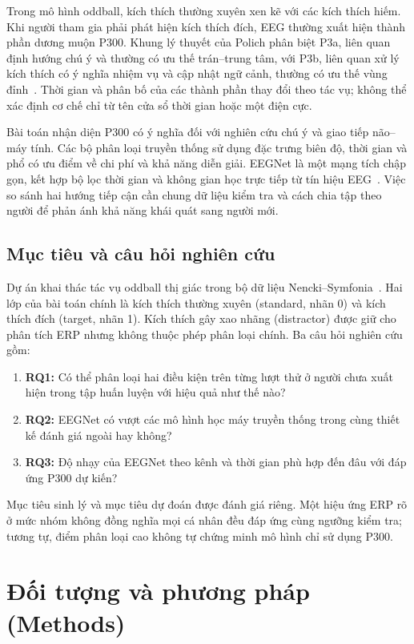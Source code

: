 \documentclass[11pt,a4paper]{article}
\begin{document}
Trong mô hình oddball, kích thích thường xuyên xen kẽ với các kích thích hiếm. Khi người tham gia phải phát hiện kích thích đích, EEG thường xuất hiện thành phần dương muộn P300. Khung lý thuyết của Polich phân biệt P3a, liên quan định hướng chú ý và thường có ưu thế trán--trung tâm, với P3b, liên quan xử lý kích thích có ý nghĩa nhiệm vụ và cập nhật ngữ cảnh, thường có ưu thế vùng đỉnh~\cite{polich}. Thời gian và phân bố của các thành phần thay đổi theo tác vụ; không thể xác định cơ chế chỉ từ tên cửa sổ thời gian hoặc một điện cực.

Bài toán nhận diện P300 có ý nghĩa đối với nghiên cứu chú ý và giao tiếp não--máy tính. Các bộ phân loại truyền thống sử dụng đặc trưng biên độ, thời gian và phổ có ưu điểm về chi phí và khả năng diễn giải. EEGNet là một mạng tích chập gọn, kết hợp bộ lọc thời gian và không gian học trực tiếp từ tín hiệu EEG~\cite{eegnet}. Việc so sánh hai hướng tiếp cận cần chung dữ liệu kiểm tra và cách chia tập theo người để phản ánh khả năng khái quát sang người mới.

\subsection{Mục tiêu và câu hỏi nghiên cứu}
Dự án khai thác tác vụ oddball thị giác trong bộ dữ liệu Nencki--Symfonia~\cite{dataset}. Hai lớp của bài toán chính là kích thích thường xuyên (standard, nhãn 0) và kích thích đích (target, nhãn 1). Kích thích gây xao nhãng (distractor) được giữ cho phân tích ERP nhưng không thuộc phép phân loại chính. Ba câu hỏi nghiên cứu gồm:
\begin{enumerate}
\item \textbf{RQ1:} Có thể phân loại hai điều kiện trên từng lượt thử ở người chưa xuất hiện trong tập huấn luyện với hiệu quả như thế nào?
\item \textbf{RQ2:} EEGNet có vượt các mô hình học máy truyền thống trong cùng thiết kế đánh giá ngoài hay không?
\item \textbf{RQ3:} Độ nhạy của EEGNet theo kênh và thời gian phù hợp đến đâu với đáp ứng P300 dự kiến?
\end{enumerate}
Mục tiêu sinh lý và mục tiêu dự đoán được đánh giá riêng. Một hiệu ứng ERP rõ ở mức nhóm không đồng nghĩa mọi cá nhân đều đáp ứng cùng ngưỡng kiểm tra; tương tự, điểm phân loại cao không tự chứng minh mô hình chỉ sử dụng P300.

\section{Đối tượng và phương pháp (Methods)}
\end{document}
